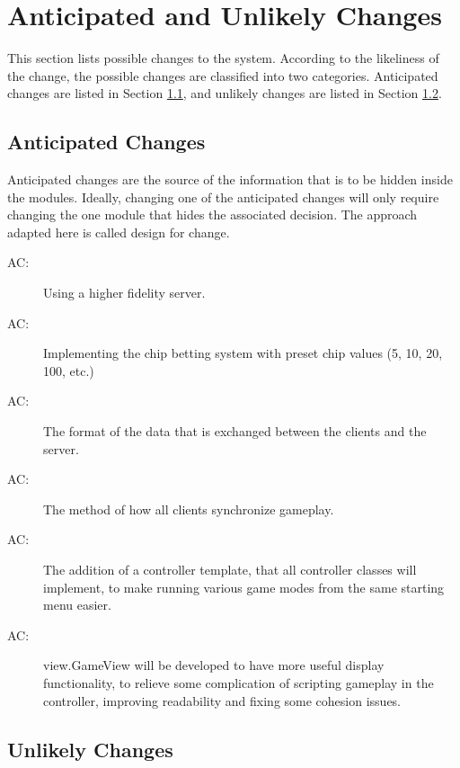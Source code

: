 \documentclass[12pt, titlepage]{article}
\newcounter{acnum}
\newcommand{\actheacnum}{AC\theacnum}
\begin{document}
\section{Anticipated and Unlikely Changes} \label{SecChange}

This section lists possible changes to the system. According to the likeliness
of the change, the possible changes are classified into two
categories. Anticipated changes are listed in Section \ref{SecAchange}, and
unlikely changes are listed in Section \ref{SecUchange}.

\subsection{Anticipated Changes} \label{SecAchange}

Anticipated changes are the source of the information that is to be hidden
inside the modules. Ideally, changing one of the anticipated changes will only
require changing the one module that hides the associated decision. The approach
adapted here is called design for
change.

\begin{description}
\item[ \actheacnum \label{acHardware}:] Using a higher fidelity server.
\item[ \actheacnum \label{acInput}:] Implementing the chip betting system with preset chip values (5, 10, 20, 100, etc.)
\item[ \actheacnum \label{acData}:] The format of the data that is exchanged between the clients and the server.
\item[ \actheacnum \label{acSync}:] The method of how all clients synchronize gameplay.
\item[ \actheacnum \label{acSync}:] The addition of a controller template, that all controller classes will implement, to make running various game modes from the same starting menu easier.
\item[ \actheacnum \label{acSync}:] view.GameView will be developed to have more useful display functionality, to relieve some complication of scripting gameplay in the controller, improving readability and fixing some cohesion issues.
\end{description}

\subsection{Unlikely Changes} \label{SecUchange}
\end{document}
